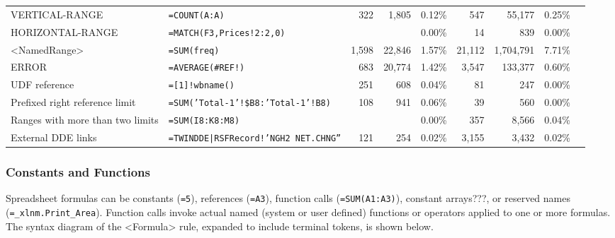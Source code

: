 \documentclass[conference]{IEEEtran}
\begin{document}
\begin{table*}
\begin{tabular}{llrrrrrrr}
			VERTICAL-RANGE & \texttt{=COUNT(A:A)} & 322 & 1,805 & 0.12\% & 547 & 55,177 & 0.25\%\\
			HORIZONTAL-RANGE & \texttt{=MATCH(F3,Prices!2:2,0)} &  &  & 0.00\% & 14 & 839 & 0.00\%\\
			<NamedRange> & \texttt{=SUM(freq)} & 1,598 & 22,846 & 1.57\% & 21,112 & 1,704,791 & 7.71\%\\
			ERROR & \texttt{=AVERAGE(\#REF!)} & 683 & 20,774 & 1.42\% & 3,547 & 133,377 & 0.60\%\\
			UDF reference & \texttt{=[1]!wbname()} & 251 & 608 & 0.04\% & 81 & 247 & 0.00\%\\
			Prefixed right reference limit & \texttt{=SUM('Total-1'!\$B8:'Total-1'!B8)} & 108 & 941 & 0.06\% & 39 & 560 & 0.00\%\\
			Ranges with more than two limits & \texttt{=SUM(I8:K8:M8)} &  &  & 0.00\% & 357 & 8,566 & 0.04\%\\
			External DDE links & \texttt{=TWINDDE|RSFRecord!'NGH2 NET.CHNG''} & 121 & 254 & 0.02\% & 3,155 & 3,432 & 0.02\%\\
			\hline
	\end{tabular}
\end{table*}

\subsubsection{Constants and Functions}

Spreadsheet formulas can be constants (\texttt{=5}), references (\texttt{=A3}), function calls (\texttt{=SUM(A1:A3)}), constant arrays???, or reserved names (\texttt{=_xlnm.Print_Area}). Function calls invoke actual named (system or user defined) functions or operators applied to one or more formulas. The syntax diagram of the <Formula> rule, expanded to include terminal tokens, is shown below.
\end{document}
